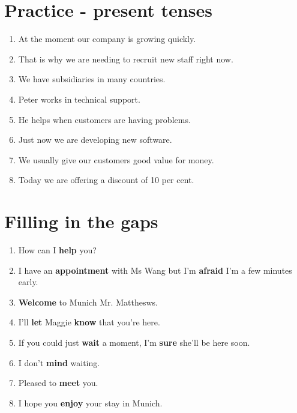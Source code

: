 \documentclass[a4paper,11pt]{scrartcl}	%
\begin{document}
\newpage

\section{Practice - present tenses}

\begin{enumerate}
	\item At the moment our company is growing quickly.
	\item That is why we are needing to recruit new staff right now.
	\item We have subsidiaries in many countries.
	\item Peter works in technical support.
	\item He helps when customers are having problems.
	\item Just now we are developing new software.
	\item We usually give our customers good value for money.
	\item Today we are offering a discount of 10 per cent.
\end{enumerate}

\section{Filling in the gaps}

\begin{enumerate}
	\item How can I \textbf{help} you?
	\item I have an \textbf{appointment} with Ms Wang but I'm \textbf{afraid} I'm a few minutes early.
	\item \textbf{Welcome} to Munich Mr. Matthesws.
	\item I'll \textbf{let} Maggie \textbf{know} that you're here.
	\item If you could just \textbf{wait} a moment, I'm \textbf{sure} she'll be here soon.
	\item I don't \textbf{mind} waiting.
	\item Pleased to \textbf{meet} you.
	\item I hope you \textbf{enjoy} your stay in Munich.
\end{enumerate}
\end{document}
